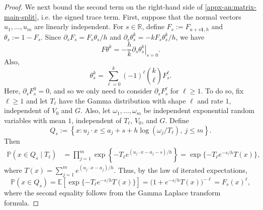 \documentclass[11pt,letterpaper]{article}
\theoremstyle{remark}
\newcommand{\E}{\mathbb E}
\newcommand{\Pp}{\mathbb P}
\newcommand{\R}{\mathbb R}
\begin{document}
\begin{proof}
We next bound the second term on the right-hand side of \eqref{appx-an:matrix-main-split}, i.e. the signed trace term.
First, suppose that the normal vectors $u_1,\dots, u_m$ are linearly independent. For
\(s\in\R\), {define} \(F_s:=F_{a+s\mathbf1,h}\) and
\(\theta_s:=1-F_s\).
Since
\( \partial_s F_s= F_s\theta_s/h\) and \(\partial_s\theta_s^k=-kF_s\theta_s^k/h\),
we have
\begin{equation}\label{eq: F theta k trick}
 F\theta^k=-\frac hk
 \left.\partial_s\theta_s^k\right|_{s=0}.
\end{equation}
Also,
\begin{equation}\label{eq: theta expansion}
 \theta_s^k
 =\sum_{\ell=0}^k(-1)^\ell\binom{k}{\ell}F_s^\ell.
\end{equation}
Here, $\partial_s F_s^0 = 0$, and so we only need to consider $\partial_s F_s^{\ell}$ for $\ell\geq 1$. To do so, fix $\ell\ge1$ and let $T_\ell$ have the Gamma
distribution with shape $\ell$ and rate \(1\), independent of $V_0$ and $G$. Also, let $\omega_1,\ldots,\omega_m$ be independent exponential random variables with mean \(1\), independent of $T_\ell$, $V_0$, and $G$.
Define
\[
 Q_s :=\left\{x:
 u_j\cdot x\le a_j+s+h\log(\omega_j/T_\ell),
 \ j\le m\right\}.
\]
Then
\[
 \begin{aligned}
 \Pp(x\in Q_s\mid T_\ell)
 &=\prod_{j=1}^m
 \exp\left\{-T_\ell
 e^{(u_j\cdot x-a_j-s)/h}\right\}
 =\exp\{-T_\ell e^{-s/h}T(x)\},
 \end{aligned}
\]
where $T(x) = \sum_{j=1}^m e^{(u_j\cdot x-a_j)/h}$. Thus, by the law of iterated expectations,
\begin{equation}
\Pp(x\in Q_s) = \E[\exp\{-T_\ell e^{-s/h}T(x)\}] = \bigl(1+e^{-s/h}T(x)\bigr)^{-\ell} = F_s(x)^\ell,
 \label{appx-an:gamma-mixture}
\end{equation}
where the second equality follows from the Gamma Laplace transform formula.


\end{proof}
\end{document}
